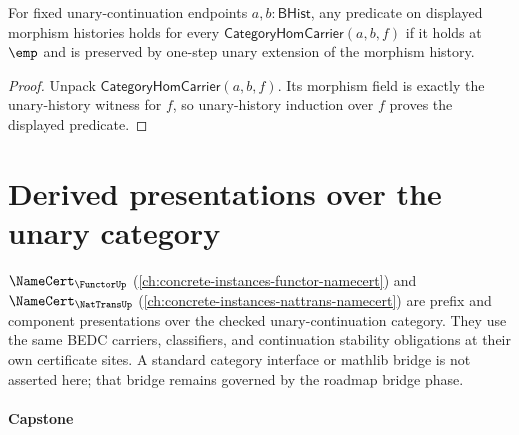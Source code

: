 \begin{theorem}
\label{thm:category-hom-carrier-morphism-induction}
For fixed unary-continuation endpoints \(a,b:\mathsf{BHist}\), any predicate
on displayed morphism histories holds for every
\(\mathsf{CategoryHomCarrier}(a,b,f)\) if it holds at \(\emp\) and is
preserved by one-step unary extension of the morphism history.
\end{theorem}
\begin{proof}
Unpack \(\mathsf{CategoryHomCarrier}(a,b,f)\). Its morphism field is exactly
the unary-history witness for \(f\), so unary-history induction over \(f\)
proves the displayed predicate.
\end{proof}

\section{Derived presentations over the unary category}
\label{sec:kernel-as-category-laws}

\begin{remark}
\label{rem:kernel-as-category-functorup-nattransup}
$\NameCert_{\FunctorUp}$ (\autoref{ch:concrete-instances-functor-namecert})
and $\NameCert_{\NatTransUp}$
(\autoref{ch:concrete-instances-nattrans-namecert}) are prefix and component
presentations over the checked unary-continuation category. They use the same
BEDC carriers, classifiers, and continuation stability obligations at their
own certificate sites. A standard category interface or mathlib bridge is not
asserted here; that bridge remains governed by the roadmap bridge phase.
\end{remark}

\paragraph{Capstone}

